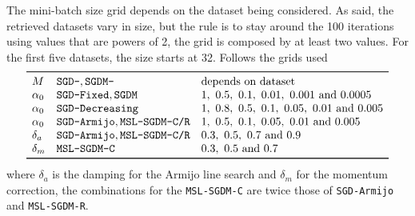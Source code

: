 The mini-batch size grid depends on the dataset being considered. As said, the retrieved datasets vary in size, but the rule is to stay around the 100 iterations using values that are powers of 2, the grid is composed by at least two values. For the first five datasets, the size starts at 32. Follows the grids used
\[
\begin{array}{lll}
\toprule
M & \text{\texttt{SGD-}}, \text{\texttt{SGDM-}} & \text{depends on dataset} \\
\alpha_0 & \text{\texttt{SGD-Fixed}}, \text{\texttt{SGDM}} & \numlist{1; 0.5; 0.1; 0.01; 0.001; 0.0005} \\
\alpha_0 & \text{\texttt{SGD-Decreasing}} & \numlist{1; 0.8; 0.5; 0.1; 0.05; 0.01; 0.005} \\
\alpha_0 & \text{\texttt{SGD-Armijo}}, \text{\texttt{MSL-SGDM-C/R}} & \numlist{1; 0.5; 0.1; 0.05; 0.01; 0.005} \\
\delta_a & \text{\texttt{SGD-Armijo}}, \text{\texttt{MSL-SGDM-C/R}} & \numlist{0.3; 0.5; 0.7; 0.9} \\
\delta_m & \text{\texttt{MSL-SGDM-C}} & \numlist{0.3; 0.5; 0.7} \\
\bottomrule
\end{array}
\]
where $\delta_a$ is the damping for the Armijo line search and $\delta_m$ for the momentum correction, the combinations for the \texttt{MSL-SGDM-C} are twice those of \texttt{SGD-Armijo} and \texttt{MSL-SGDM-R}.

